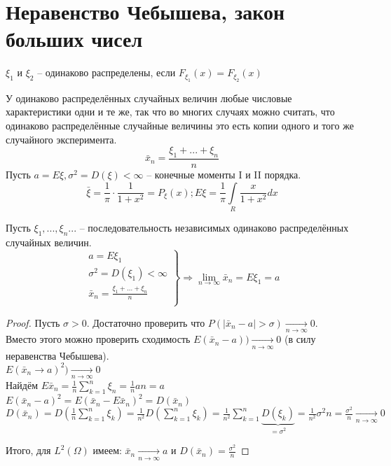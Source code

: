 \section{Неравенство Чебышева, закон больших чисел}
\begin{definition}
$\xi_1$ и $\xi_2$ -- одинаково распределены, если $F_{\xi_1}(x)=F_{\xi_2}(x)$
\end{definition}
У одинаково распределённых случайных величин любые числовые характеристики одни и те же, так что во многих случаях можно считать, что одинаково распределённые случайные величины это есть копии одного и того же случайного эксперимента.
$$\bar{x}_n = \frac{\xi_1 + ... + \xi_n}{n}$$
Пусть $a = E\xi, \sigma^2 = D(\xi) < \infty$ -- конечные моменты I и II порядка.
$$\bar{\xi} = \frac{1}{\pi}\cdot\frac{1}{1+x^2}=P_\xi(x); E\xi = \frac{1}{\pi}\int\limits_R \frac{x}{1+x^2}dx$$
\begin{theorem}
Пусть $\xi_{1},..., \xi_{n}...$ -- последовательность независимых одинаково распределённых случайных величин.
$$\left.\begin{array}{r}
a = E\xi_{1}\\
\sigma^{2} = D(\xi_{1}) < \infty\\
\bar{x}_n = \frac{\xi_{1}+...+\xi_{n}}{n}\\
\end{array}\right\}\Rightarrow\lim\limits_{n\rightarrow\infty}\bar{x}_n=E\xi_1=a$$
\end{theorem}
\begin{proof}
Пусть $\sigma > 0$. Достаточно проверить что $P(|\bar{x}_n - a|>\sigma)\xrightarrow[n\rightarrow\infty]{}0$.\\
Вместо этого можно проверить сходимость $E(\bar{x}_n-a))\xrightarrow[n\rightarrow\infty]{}0$ (в силу неравенства Чебышева).\\
$E(\bar{x}_n\rightarrow a)^2)\xrightarrow[n\rightarrow\infty]{}0$\\
Найдём $E\bar{x}_n = \frac{1}{n}\sum\limits_{k=1}^n \xi_n=\frac{1}{n} a n = a$\\
$E(\bar{x}_n-a)^2=E(\bar{x}_n-E\bar{x}_n)^2=D(\bar{x}_n)$\\
$D(\bar{x}_n) = D\left(\frac{1}{n}\sum\limits_{k=1}^n \xi_k\right)=\frac{1}{n^2}D\left(\sum\limits_{k=1}^n \xi_k\right)=\frac{1}{n^2}\sum\limits_{k=1}^n \underbrace{D(\xi_k)}_{=\sigma^2}=\frac{1}{n^2}\sigma^2 n=\frac{\sigma^2}{n}\xrightarrow[n\rightarrow\infty]{}0$

Итого, для $L^2(\Omega)$ имеем: $\bar{x}_n\xrightarrow[n\rightarrow\infty]{}a$ и $D(\bar{x}_n)=\frac{\sigma^2}{n}$
\end{proof}
